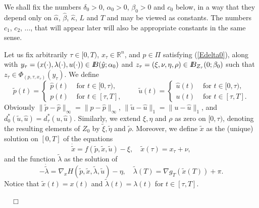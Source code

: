 \documentclass[11pt]{article}
\newcommand{\bd}{\begin{displaymath}}
\newcommand{\ed}{\end{displaymath}}
\newcommand{\B}{I\kern -.35em B}
\newcommand{\R}{\mathbb R}
\renewenvironment{proof}[1]{%
\par\vspace{1\baselineskip}%
\noindent{\em Proof#1.\ \ }\ignorespaces }{%
\nobreak\hfill\mbox{\ \ $\Box$}%
\par\vspace{1\baselineskip}%
}
\newcommand{\al}{\alpha}
\def\R{\mathbb{R}}
\begin{document}
\begin{proof}{}
We shall fix the numbers $\delta_0 > 0$, $\al_0 > 0$, $\beta_0 > 0$ and $c_0$ below, in a way that they 
depend only on $\hat \al$, $\hat\beta$, $\hat \kappa$, $L$ and $T$ and may be viewed as constants.
The numbers $c_1$, $c_2$, ..., that will appear later will also be appropriate constants in the  same sense.

Let us fix arbitrarily $\tau \in [0,T)$, $x_\tau \in \R^n$, and $p \in \varPi$ satisfying (\ref{Edelta0}), along with 
$y_\tau = (x(\cdot), \lambda(\cdot), u(\cdot)) \in \B(\hat y; \al_0)$ and 
$z_\tau = (\xi,\nu, \eta,\rho) \in \B_{Z_\tau}(0;\beta_0)$ 
such that $z_\tau \in \Phi_{(p,\tau,x_\tau)}(y_\tau)$. We define
\bd
               \tilde p(t) = \left\{ \begin{array}{cl}
                            \hat p(t) & \mbox{ for } t \in [0,\tau), \\ 
                             p(t)   & \mbox{ for } t \in [\tau, T],
                                \end{array} \right. \qquad
               \tilde u(t) = \left\{ \begin{array}{cl}
                            \hat u(t) & \mbox{ for } t \in [0,\tau), \\ 
                             u(t)   & \mbox{ for } t \in [\tau, T].
                                \end{array} \right.
\ed
Obviously $\| \tilde p - \hat p \|_\infty = \| p - \hat p \|_\infty$,  $\| \tilde u - \hat u \|_1 = \| u - \hat  u \|_1$, and 
$d_0^*(\tilde u, \hat u) =d_\tau^*(u,\hat u)$.  Similarly, we extend $\xi,\eta$ and $\rho$ as zero on $[0,\tau)$, denoting the 
resulting elements of $Z_0$ by $\tilde \xi,\tilde\eta$ and $\tilde \rho$.
Moreover, we define $\tilde x$ as the (unique) solution on $[0, T]$ of the equations
\bd
             \dot {\tilde x} = f(\tilde p, \tilde x, \tilde u) -\xi, \quad \tilde x(\tau) = x_ \tau + \nu,
\ed
and the function $\tilde \lambda$ as the  solution of 
\bd
            -\dot {\tilde \lambda} = \nabla_{\!\! x} H(\tilde p, \tilde x, \tilde \lambda,  \tilde u) -\eta, 
               \quad \tilde \lambda(T) = \nabla g_T(\tilde x(T)) + \pi.
\ed
Notice that $\tilde x(t) = x(t)$ and $\tilde \lambda(t) = \lambda(t)$ for $t \in [\tau,T]$.


\end{proof}
\end{document}
